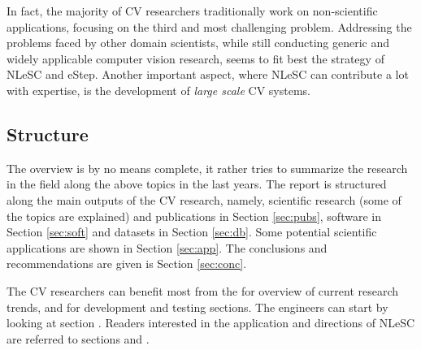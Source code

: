In fact, the majority of CV researchers traditionally work on non-scientific applications, focusing on the third and most challenging problem. Addressing the problems faced by other domain scientists, while still conducting generic and widely applicable computer vision research, seems to fit best the strategy of NLeSC and eStep. Another important aspect, where NLeSC can contribute a lot with expertise, is the development of {\em large scale} CV systems.

\subsection{Structure}
The overview is by no means complete, it rather tries to summarize the research in the field along the above topics in the last years. The report is structured along the main outputs of the CV research, namely, scientific research (some of the topics are explained) and publications in Section \ref{sec:pubs}, software in Section \ref{sec:soft} and datasets in Section \ref{sec:db}. Some potential scientific applications are shown in Section \ref{sec:app}. The conclusions and recommendations are given is Section \ref{sec:conc}.

The CV researchers can benefit most from the  for overview of current research trends, and  for development and testing sections.
The engineers can start by looking at section .
Readers interested in the application and directions of NLeSC are referred to sections  and .
